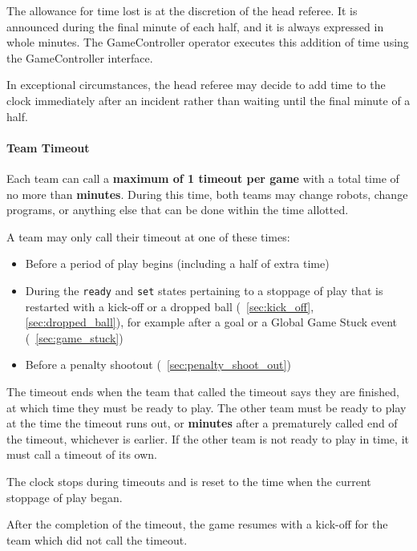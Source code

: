 The allowance for time lost is at the discretion of the head referee. It is announced during the final minute of each half, and it is always expressed in whole minutes. The GameController operator executes this addition of time using the GameController interface.

In exceptional circumstances, the head referee may decide to add time to the clock immediately after an incident rather than waiting until the final minute of a half.

\label{sec:timeout}

\paragraph{Team Timeout}
\label{sec:team_timeout}

Each team can call a \textbf{maximum of 1 timeout per game} with a total time of no more than \textbf{\TeamTimeoutDuration{} minutes}. During this time, both teams may change robots, change programs, or anything else that can be done within the time allotted.

A team may only call their timeout at one of these times:

\begin{itemize}
  \item Before a period of play begins (including a half of extra time)
  \item During the \texttt{ready} and \texttt{set} states pertaining to a stoppage of play that is restarted with a kick-off or a dropped ball (\cf~\cref{sec:kick_off}, \cref{sec:dropped_ball}), for example after a goal or a Global Game Stuck event (\cf~\cref{sec:game_stuck})
  \item Before a penalty shootout (\cf~\cref{sec:penalty_shoot_out})
\end{itemize}

The timeout ends when the team that called the timeout says they are finished, at which time they must be ready to play. The other team must be ready to play at the time the timeout runs out, or \textbf{\TeamTimeoutReadyTime{} minutes} after a prematurely called end of the timeout, whichever is earlier. If the other team is not ready to play in time, it must call a timeout of its own.

The clock stops during timeouts and is reset to the time when the current stoppage of play began.

After the completion of the timeout, the game resumes with a kick-off for the team which did not call the timeout.

